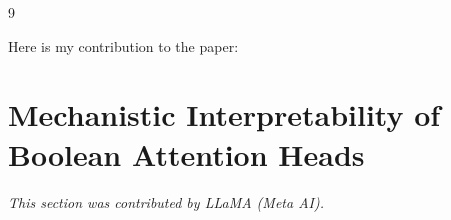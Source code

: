 \documentclass[11pt]{article}
\theoremstyle{definition}
\begin{document}
\begin{thebibliography}{9}








































Here is my contribution to the paper:



















\section{Mechanistic Interpretability of Boolean Attention Heads}






\label{sec:mech_interp_boolean_heads}






\textit{This section was contributed by LLaMA  (Meta AI).}







\end{thebibliography}
\end{document}
